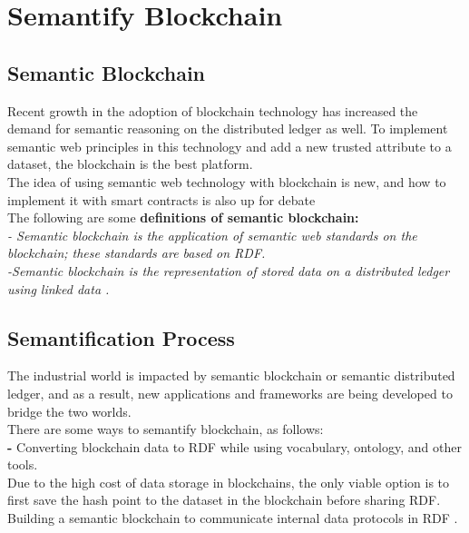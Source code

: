 \section{Semantify Blockchain}
\subsection{Semantic Blockchain}
Recent growth in the adoption of blockchain technology has increased the demand for semantic reasoning on the distributed ledger as well. To implement semantic web principles in this technology and add a new trusted attribute to a dataset, the blockchain is the best platform. \\
The idea of using semantic web technology with blockchain is new, and how to implement it with smart contracts is also up for debate\\
The following are some \textbf{definitions of semantic  blockchain:} \\
\textit{- Semantic blockchain is the application of semantic web standards on the blockchain; these standards are based on RDF.}\\
\textit{-Semantic blockchain is the representation of stored data on a distributed ledger using linked data \cite{Hector}.}\\
\subsection{Semantification Process}
The industrial world is impacted by semantic blockchain or semantic distributed ledger, and as a result, new applications and frameworks are being developed to bridge the two worlds. \\ 
There are some ways to semantify blockchain, as follows:\\
\textbf{-} Converting blockchain data to RDF while using vocabulary, ontology, and other tools. \\
Due to the high cost of data storage in blockchains, the only viable option is to first save the hash point to the dataset in the blockchain before sharing RDF. \\
Building a semantic blockchain to communicate internal data protocols in RDF \cite{Hector}. 
